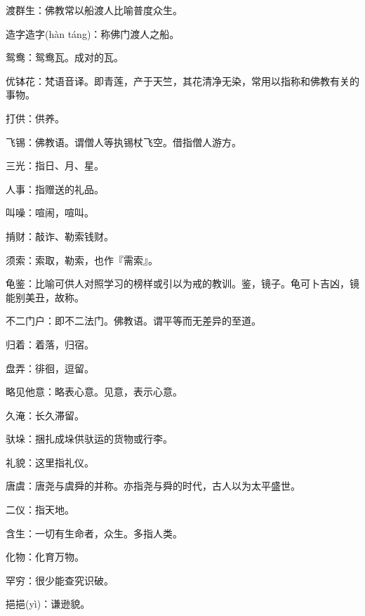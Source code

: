 \startbuffer[2485]
渡群生：佛教常以船渡人比喻普度众生。
\stopbuffer


\startbuffer[2486]
造字造字(hàn táng)：称佛门渡人之船。
\stopbuffer


\startbuffer[2487]
鸳鸯：鸳鸯瓦。成对的瓦。
\stopbuffer


\startbuffer[2488]
优钵花：梵语音译。即青莲，产于天竺，其花清净无染，常用以指称和佛教有关的事物。
\stopbuffer


\startbuffer[2489]
打供：供养。
\stopbuffer


\startbuffer[2490]
飞锡：佛教语。谓僧人等执锡杖飞空。借指僧人游方。
\stopbuffer


\startbuffer[2491]
三光：指日、月、星。
\stopbuffer


\startbuffer[2492]
人事：指赠送的礼品。
\stopbuffer


\startbuffer[2493]
叫噪：喧闹，喧叫。
\stopbuffer


\startbuffer[2494]
掯财：敲诈、勒索钱财。
\stopbuffer


\startbuffer[2495]
须索：索取，勒索，也作『需索』。
\stopbuffer


\startbuffer[2496]
龟鉴：比喻可供人对照学习的榜样或引以为戒的教训。鉴，镜子。龟可卜吉凶，镜能别美丑，故称。
\stopbuffer


\startbuffer[2497]
不二门户：即不二法门。佛教语。谓平等而无差异的至道。
\stopbuffer


\startbuffer[2498]
归着：着落，归宿。
\stopbuffer


\startbuffer[2499]
盘弄：徘徊，逗留。
\stopbuffer


\startbuffer[2500]
略见他意：略表心意。见意，表示心意。
\stopbuffer


\startbuffer[2501]
久淹：长久滞留。
\stopbuffer


\startbuffer[2502]
驮垛：捆扎成垛供驮运的货物或行李。
\stopbuffer


\startbuffer[2503]
礼貌：这里指礼仪。
\stopbuffer


\startbuffer[2504]
唐虞：唐尧与虞舜的并称。亦指尧与舜的时代，古人以为太平盛世。
\stopbuffer


\startbuffer[2505]
二仪：指天地。
\stopbuffer


\startbuffer[2506]
含生：一切有生命者，众生。多指人类。
\stopbuffer


\startbuffer[2507]
化物：化育万物。
\stopbuffer


\startbuffer[2508]
罕穷：很少能查究识破。
\stopbuffer


\startbuffer[2509]
挹挹(yì)：谦逊貌。
\stopbuffer


